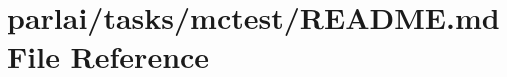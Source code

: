 \hypertarget{parlai_2tasks_2mctest_2README_8md}{}\section{parlai/tasks/mctest/\+R\+E\+A\+D\+ME.md File Reference}
\label{parlai_2tasks_2mctest_2README_8md}
